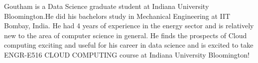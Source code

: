 Goutham is a Data Science graduate student at Indiana University Bloomington.He
did his bachelors study in Mechanical Engineering at IIT Bombay, India. He had 4
years of experience in the energy sector and is relatively new to the area of
computer science in general. He finds the prospects of Cloud computing exciting
and useful for his career in data science and is excited to take ENGR-E516 CLOUD
COMPUTING course at Indiana University Bloomington!
